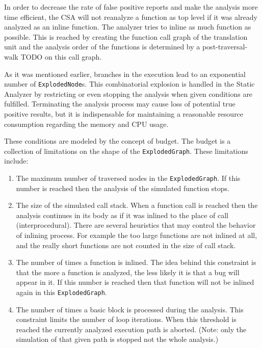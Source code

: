 In order to decrease the rate of false positive reports and make the analysis 
more time efficient, the CSA will not reanalyze a function as top level if it 
was already analyzed as an inline function. The analyzer tries to inline as 
much function as possible. This is reached by creating the function call graph 
of the translation unit and the analysis order of the functions is determined 
by a post-traversal-walk TODO on this call graph.

As it was mentioned earlier, branches in the execution lead to an exponential number of \texttt{ExplodedNode}s.
This combinatorial explosion is handled in the Static Analyzer by restricting or even stopping
the analysis when given conditions are fulfilled. Terminating the analysis 
process may cause loss of potential true positive results, but it is 
indispensable for maintaining a reasonable resource consumption regarding the 
memory and CPU usage. 

These conditions are modeled by the concept of budget.
The budget is a collection of limitations on the shape of the \texttt{ExplodedGraph}.
These limitations include:
\begin{enumerate}  
	\item The maximum number of traversed nodes in the \texttt{ExplodedGraph}. 
	If 	this number is reached then the analysis of the simulated function stops.
	\item The size of the simulated call stack. When a function call is 
	reached then the analysis continues in its body as if it was inlined to the 
	place of call (interprocedural). There are several heuristics that may control 
	the	behavior of inlining process. For example the too large functions are 
	not	inlined at all, and the really short functions are not counted in the 
	size of	call stack.
	\item The number of times a function is inlined. The idea behind this
	constraint is that the more a function is analyzed, the less likely it 
	is that a 	bug will appear in it. If this number is reached then that 
	function will not be inlined again in this \texttt{ExplodedGraph}.
	\item The number of times a basic block is processed during the 
	analysis. This	constraint limits the number of loop iterations. When this 
	threshold is reached the currently analyzed execution path is aborted. 
	(Note: only the simulation of that given path is stopped not the whole 
	analysis.)
\end{enumerate}

